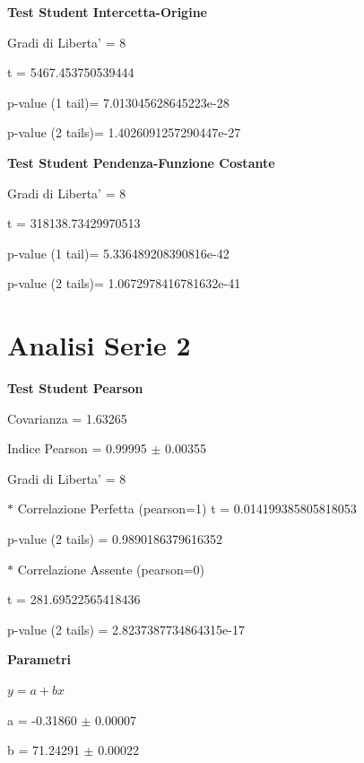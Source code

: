 \documentclass{article}
\begin{document}
\textbf{Test Student Intercetta-Origine}

Gradi di Liberta' = 8

t = 5467.453750539444

p-value (1 tail)= 7.013045628645223e-28

p-value (2 tails)= 1.4026091257290447e-27

\textbf{Test Student Pendenza-Funzione Costante}

Gradi di Liberta' = 8

t = 318138.73429970513

p-value (1 tail)= 5.336489208390816e-42

p-value (2 tails)= 1.0672978416781632e-41

\section*{Analisi Serie 2}

\textbf{Test Student Pearson}

Covarianza = 1.63265

Indice Pearson = 0.99995 $\pm$ 0.00355

Gradi di Liberta' = 8

$\ast$ Correlazione Perfetta (pearson=1)
t = 0.014199385805818053

p-value (2 tails) = 0.9890186379616352

$\ast$ Correlazione Assente (pearson=0)

t = 281.69522565418436

p-value (2 tails) = 2.8237387734864315e-17

\textbf{Parametri}

$y = a + bx$

a = -0.31860 $\pm$ 0.00007

b = 71.24291 $\pm$ 0.00022
\end{document}
